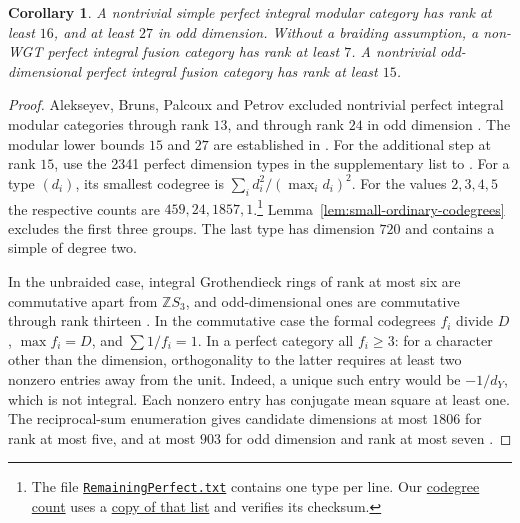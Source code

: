 \documentclass[11pt,a4paper]{article}
\numberwithin{equation}{section}
\newtheorem{corollary}[theorem]{Corollary}
\theoremstyle{remark}
\begin{document}
\begin{corollary}\label{cor:all-dim-rank}
A nontrivial simple perfect integral modular category has rank at least $16$,
and at least $27$ in odd dimension. Without a braiding assumption,
a non-WGT perfect integral fusion category has rank at least $7$. A nontrivial odd-dimensional perfect integral fusion category has rank at least $15$.
\end{corollary}
\begin{proof}
Alekseyev, Bruns, Palcoux and Petrov excluded nontrivial perfect integral modular categories through rank $13$, and through rank $24$ in odd dimension \cite[Theorems~1.5 and~12.2]{ABPPModular}. The modular lower bounds $15$ and $27$ are established in
\cite[Corollaries~1.2 and~1.3]{DPLCM}. For the additional step at rank
$15$, use the 2341 perfect dimension types in the supplementary list
to \cite[Section~4.3]{DPLCM}. For a type $(d_i)$, its smallest codegree is
$\sum_i d_i^2/(\max_i d_i)^2$. For the values $2,3,4,5$ the respective
counts are $459,24,1857,1$.\footnote{The file
\href{https://github.com/sebastienpalcoux/Fusion-Categories/blob/06f3a37b086c0591e086a3aed9a9458f4270165f/NewCritPaper/Rank15/RemainingPerfect.txt}{\texttt{RemainingPerfect.txt}}
contains one type per line. Our \href{https://github.com/sebastienpalcoux/WGT-fusion-categories/blob/f7f9f9a02f3116e61eb9dca4eebfed77001494e8/code/verify_rank15_published.py}{codegree count} uses a \href{https://github.com/sebastienpalcoux/WGT-fusion-categories/blob/f7f9f9a02f3116e61eb9dca4eebfed77001494e8/data/published-rank15-perfect.txt}{copy of that list} and verifies its checksum.}
Lemma~\ref{lem:small-ordinary-codegrees} excludes the first three groups.
The last type has dimension $720$ and contains a simple of degree two.

In the unbraided case, integral Grothendieck rings of rank at most six
are commutative apart from $\mathbb Z S_3$, and odd-dimensional ones
are commutative through rank thirteen \cite[Theorems~1.5 and~1.8]{ABDPIntegral}.
In the commutative case the formal codegrees $f_i$ divide $D$,
$\max f_i=D$, and $\sum 1/f_i=1$. In a perfect category all $f_i\ge3$:
for a character other than the dimension, orthogonality to the latter
requires at least two nonzero entries away from the unit. Indeed, a
unique such entry would be $-1/d_Y$, which is not integral.
Each nonzero entry has conjugate mean square at least one.
The reciprocal-sum enumeration gives candidate dimensions at most $1806$ for rank at most five,
and at most $903$ for odd dimension and rank at most seven
\cite[Sections~7.1 and~8.2.2]{ABDPIntegral}.


\end{proof}
\end{document}
